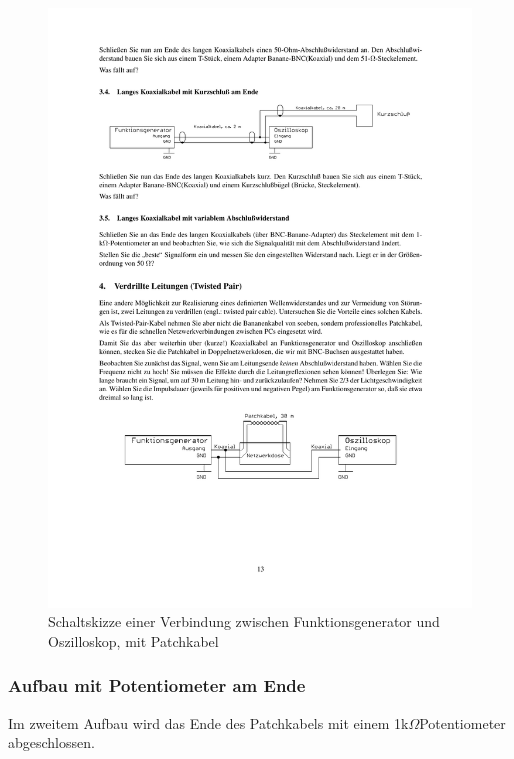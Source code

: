 \documentclass[12pt,a4paper]{article}
\begin{document}
\begin{figure}[H] 
  \centering
    \includegraphics[trim = 10mm 60mm 10mm 200mm, clip, scale = 1]{3_4-4.pdf}
  	\caption[Schaltskizze einer Verbindung zwischen Funktionsgenerator und Oszilloskop, mit Patchkabel]{Schaltskizze einer Verbindung zwischen Funktionsgenerator und Oszilloskop, mit Patchkabel\footnotemark}
  \label{fig:4.1}
\end{figure}

\subsubsection{Aufbau mit Potentiometer am Ende}

Im zweitem Aufbau wird das Ende des Patchkabels mit einem 1k$\Omega$Potentiometer abgeschlossen.
\end{document}
